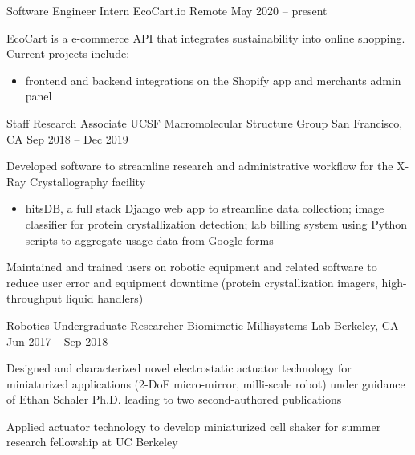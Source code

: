 \begin{cventries}
  \cventry
    {Software Engineer Intern}
    {EcoCart.io}
    {Remote}
    {May 2020 – present}
    {
      \begin{cvitems}
        \item {EcoCart is a e-commerce API that integrates sustainability into online shopping. Current projects include: 
            \begin{itemize}
                \item frontend and backend integrations on the Shopify app and merchants admin panel
            \end{itemize}
        }
      \end{cvitems}
    }
  \cventry
    {Staff Research Associate}
    {UCSF Macromolecular Structure Group}
    {San Francisco, CA}
    {Sep 2018 – Dec 2019}
    {
      \begin{cvitems}
        \item {Developed software to streamline research and administrative workflow for the X-Ray Crystallography facility
            \begin{itemize}
                \item hitsDB, a full stack Django web app to streamline data collection; image classifier for protein crystallization detection; lab billing system using Python scripts to aggregate usage data from Google forms
            \end{itemize}
        }
        \item {Maintained and trained users on robotic equipment and related software to reduce user error and equipment downtime (protein crystallization imagers, high-throughput liquid handlers)}
      \end{cvitems}
    }
  \cventry
    {Robotics Undergraduate Researcher}
    {Biomimetic Millisystems Lab}
    {Berkeley, CA}
    {Jun 2017 – Sep 2018}
    {
      \begin{cvitems}
        \item {Designed and characterized novel electrostatic actuator technology for miniaturized applications (2-DoF micro-mirror, milli-scale robot) under guidance of Ethan Schaler Ph.D. leading to two second-authored publications}
        \item {Applied actuator technology to develop miniaturized cell shaker for summer research fellowship at UC Berkeley}
      \end{cvitems}
    }
\end{cventries}
